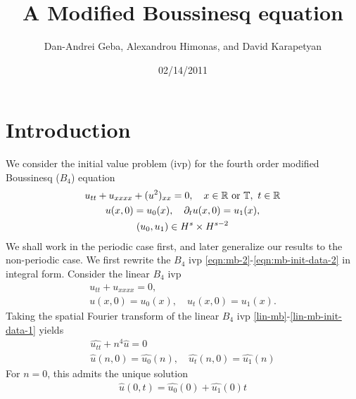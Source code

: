 \documentclass[12pt,reqno]{amsart}
\numberwithin{equation}{section}  %
\newcommand{\rr}{\mathbb{R}}
\newcommand{\ci}{\mathbb{T}}
\newcommand{\wh}{\widehat}
\newcommand{\p}{\partial}
\begin{document}
\title{A Modified Boussinesq equation}
\author{Dan-Andrei Geba, Alexandrou Himonas, and David Karapetyan}
\address{Department of Mathematics, University of Rochester, Rochester, NY 14627}
\address{Department of Mathematics, University of Notre Dame, Notre Dame, IN 46556}
\address{Department of Mathematics, University of Notre Dame, Notre Dame, IN 46556}
\date{02/14/2011}
%
%
\maketitle
\tableofcontents
%
%
\section{Introduction}
%
We consider the initial value problem (ivp) for the fourth order modified Boussinesq
($B_4$) equation 
\begin{gather}
  u_{tt}   + u_{xxxx} + (u^2)_{xx} = 0, \quad x \in \rr \text{ or }
  \ci,\text{ } t \in \rr
  \label{eqn:mb-2}
  \\
  u(x,0) = u_{0}(x), \quad \p_t u(x, 0) = u_1(x), 
  \label{eqn:mb-init-data-2}
  \\
  \notag
  (u_0, u_1) \in
  H^{s}\times
  H^{s-2}
\end{gather}
%
%
We shall work in the periodic case first, and later generalize our results to
the non-periodic case. We first rewrite the $B_4$ ivp
\eqref{eqn:mb-2}-\eqref{eqn:mb-init-data-2} in integral form. 
Consider
the linear $B_4$ ivp
\begin{gather}
  u_{tt} + u_{xxxx} = 0,
  \label{lin-mb}
  \\
  u(x, 0)=u_{0}(x), \quad u_{t}(x,0) = u_{1}(x).
  \label{lin-mb-init-data-1}
\end{gather}
Taking the spatial Fourier transform of the linear $B_{4}$ ivp
\eqref{lin-mb}-\eqref{lin-mb-init-data-1} yields
%
%
\begin{gather}
  \wh{u_{tt}} + n^{4} \wh{u} = 0
  \label{four-trans-lin-mb}
  \\
  \wh{u}(n, 0) = \wh{u_{0}}(n), \quad \wh{u_{t}}(n, 0) = \wh{u_{1}}(n)
  \label{four-trans-lin-mb-data}
\end{gather}
For $n=0$, this admits the unique solution
%
%
\begin{equation}
  \label{nzerosoln}
\begin{split}
  \wh{u}(0,t) = \wh{u_{0}}(0) + \wh{u_{1}}(0)t
\end{split}
\end{equation}
\end{document}
